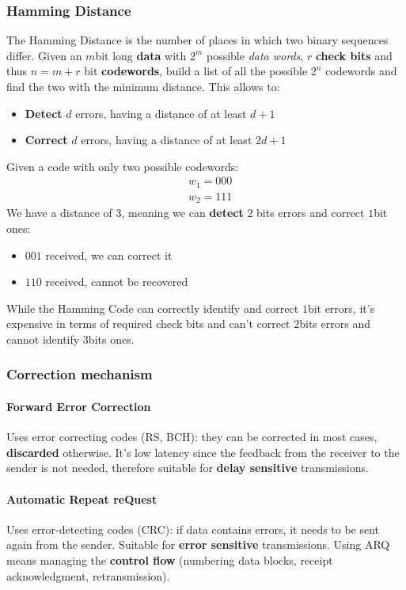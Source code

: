 \subsubsection{Hamming Distance}
The Hamming Distance is the number of places in which two binary sequences differ. Given an $m$bit long \textbf{data} with $2^m$ possible \textit{data words}, $r$ \textbf{check bits} and thus $n=m+r$ bit \textbf{codewords}, build a list of all the possible $2^n$ codewords and find the two with the minimum distance. This allows to:
\begin{itemize}
	\item \textbf{Detect} $d$ errors, having a distance of at least $d+1$
	\item \textbf{Correct} $d$ errors, having a distance of at least $2d+1$
\end{itemize}

\begin{example}
	Given a code with only two possible codewords:
	\begin{align*}
		& w_1=000 \\
		& w_2 = 111
	\end{align*}
	We have a distance of $3$, meaning we can \textbf{detect} $2$ bits errors and correct $1$bit ones:
	\begin{itemize}
		\item $001$ received, we can correct it
		\item $110$ received, cannot be recovered
	\end{itemize}
\end{example}

While the Hamming Code can correctly identify and correct $1$bit errors, it's expensive in terms of required check bits and can't correct $2$bits errors and cannot identify $3$bits ones.

\subsubsection{Correction mechanism}
\paragraph{Forward Error Correction} Uses error correcting codes (RS, BCH): they can be corrected in most cases, \textbf{discarded} otherwise. It's low latency since the feedback from the receiver to the sender is not needed, therefore suitable for \textbf{delay sensitive} transmissions.

\paragraph{Automatic Repeat reQuest}
Uses error-detecting codes (CRC): if data contains errors, it needs to be sent again from the sender. Suitable for \textbf{error sensitive} transmissions. Using ARQ means managing the \textbf{control flow} (numbering data blocks, receipt acknowledgment, retransmission).


